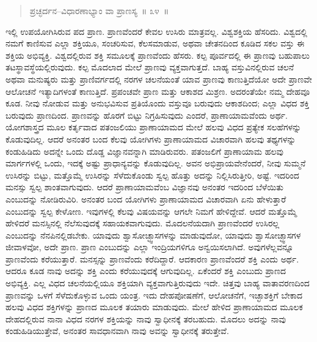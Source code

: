\eject


\begin{verse}
ಪ್ರಚ್ಛರ್ದನ–ವಿಧಾರಣಾಭ್ಯಾಂ ವಾ ಪ್ರಾಣಸ್ಯ~॥ ೩೪~॥
\end{verse}

\vspace{-0.4cm}


ಇಲ್ಲಿ ಉಪಯೋಗಿಸಿರುವ ಪದ ಪ್ರಾಣ. ಪ್ರಾಣವೆಂದರೆ ಕೇವಲ ಉಸಿರು ಮಾತ್ರವಲ್ಲ. ವಿಶ್ವಶಕ್ತಿಯ ಹೆಸರಿದು. ವಿಶ್ವದಲ್ಲಿ ನಮಗೆ ಕಾಣಿಸುವ ಎಲ್ಲಾ ಶಕ್ತಿಯೂ, ಸಂಚರಿಸುವ, ಕೆಲಸಮಾಡುವ, ಅಥವಾ ಚೇತನದಿಂದ ಕೂಡಿದ ಸಕಲ ವಸ್ತು ಈ ಶಕ್ತಿಯ ಅಭಿವ್ಯಕ್ತಿ. ವಿಶ್ವದಲ್ಲಿರುವ ಶಕ್ತಿ ಸಮೂಲಕ್ಕೆ ಪ್ರಾಣವೆಂದು ಹೆಸರು. ಕಲ್ಪ ಪೂರ್ವದಲ್ಲಿ ಈ ಪ್ರಾಣವು ಬಹುಪಾಲು ತಟಸ್ಥಾವಸ್ಥೆಯಲ್ಲಿರುವುದು. ಕಲ್ಪ ಮೊದಲಾದ ಮೇಲೆ ಪ್ರಾಣವು ವ್ಯಕ್ತವಾಗುತ್ತದೆ. ಬಾಹ್ಯ ವಸ್ತುವಿನಲ್ಲಿರುವ ಚಲನೆ ಅಥವಾ ಮನುಷ್ಯರು ಮತ್ತು ಪ್ರಾಣಿವರ್ಗದಲ್ಲಿ ನರಗಳ ಚಲನೆಯಂತೆ ಯಾವ ಪ್ರಾಣವು ಕಾಣುತ್ತಿದೆಯೋ ಅದೇ ಪ್ರಾಣವೇ ಆಲೋಚನೆ ಇತ್ಯಾದಿಗಳಂತೆ ಕಾಣುತ್ತಿದೆ. ಪ್ರಪಂಚವೇ ಪ್ರಾಣ ಮತ್ತು ಆಕಾಶದ ಮಿಶ್ರಣ. ಅದರಂತೆಯೇ ನಮ್ಮ ದೇಹವೂ ಕೂಡ. ನೀವು ನೋಡುವ ಮತ್ತು ಅನುಭವಿಸುವ ಪ್ರತಿಯೊಂದು ವಸ್ತುವೂ ಬರುವುದು ಆಕಾಶದಿಂದ; ಎಲ್ಲಾ ವಿಧದ ಶಕ್ತಿ ಬರುವುದು ಪ್ರಾಣದಿಂದ. ಪ್ರಾಣವನ್ನು ಹೊರಗೆ ಬಿಟ್ಟು ನಿಗ್ರಹಿಸುವುದು ಎಂದರೆ, ಪ್ರಾಣಾಯಾಮವೆಂದು ಅರ್ಥ. ಯೋಗಶಾಸ್ತ್ರದ ಮೂಲ ಕರ್ತೃವಾದ ಪತಂಜಲಿಯು ಪ್ರಾಣಾಯಾಮದ ಮೇಲೆ ಹಲವು ವಿಧದ ಪ್ರತ್ಯೇಕ ಸಲಹೆಗಳನ್ನು ಕೊಡುವುದಿಲ್ಲ. ಆದರೆ ಅನಂತರ ಬಂದ ಕೆಲವು ಯೋಗಿಗಳು ಪ್ರಾಣಾಯಾಮದ ವಿಚಾರವಾಗಿ ಹಲವು ತಥ್ಯಗಳನ್ನು ಕಂಡುಹಿಡಿದು ಅದನ್ನೇ ಒಂದು ದೊಡ್ಡ ವಿಜ್ಞಾನವನ್ನಾಗಿ ಮಾಡಿರುವರು. ಪತಂಜಲಿಗೆ ಪ್ರಾಣಾಯಾಮ ಹಲವು ಮಾರ್ಗಗಳಲ್ಲಿ ಒಂದು, ಇದಕ್ಕೆ ಅಷ್ಟು ಪ್ರಾಧಾನ್ಯವನ್ನು ಕೊಡುವುದಿಲ್ಲ. ಅವನ ಅಭಿಪ್ರಾಯವೇನೆಂದರೆ, ನೀವು ಸುಮ್ಮನೆ ಉಸಿರನ್ನು ಬಿಟ್ಟು, ಮತ್ತೊಮ್ಮೆ ಉಸಿರನ್ನು ಸೆಳೆದುಕೊಂಡು ಸ್ವಲ್ಪ ಹೊತ್ತು ಅದನ್ನು ನಿಲ್ಲಿಸಿರುತ್ತೀರಿ, ಅಷ್ಟೆ. ಇದರಿಂದ ಮನಸ್ಸು ಸ್ವಲ್ಪ ಶಾಂತವಾಗುವುದು. ಆದರೆ ಪ್ರಾಣಾಯಾಮವೆಂಬ ವಿಜ್ಞಾನವು ಅನಂತರ ಇದರಿಂದ ಬೆಳೆಯಿತು ಎಂಬುದನ್ನು ನೋಡಿರುವಿರಿ. ಅನಂತರ ಬಂದ ಯೋಗಿಗಳು ಪ್ರಾಣಾಯಾಮದ ವಿಚಾರವಾಗಿ ಏನು ಹೇಳುತ್ತಾರೆ ಎಂಬುದನ್ನು ಸ್ವಲ್ಪ ಕೇಳೋಣ. ಇವುಗಳಲ್ಲಿ ಕೆಲವು ವಿಷಯವನ್ನು ಆಗಲೇ ನಿಮಗೆ ಹೇಳಿದ್ದೇವೆ. ಆದರೆ ಮತ್ತೊಮ್ಮೆ ಹೇಳಿದರೆ ಮನಸ್ಸಿನಲ್ಲಿ ನೆಲೆಸುವುದಕ್ಕೆ ಸಹಾಯಕವಾಗುವುದು. ಮೊದಲನೆಯದಾಗಿ ಪ್ರಾಣವೆಂದರೆ ಉಸಿರಲ್ಲ ಎಂಬುದನ್ನು ನೆನಪಿನಲ್ಲಿಡಬೇಕು. ಯಾವುದು ಶ್ವಾಸೋಚ್ಛ್ವಾಸಗಳನ್ನು ಮಾಡುವುದೋ, ಯಾವುದು ಶ್ವಾಸೋಚ್ಛ್ವಾಸಗಳ ಜೀವಾಳವೋ, ಅದೇ ಪ್ರಾಣ. ಪ್ರಾಣ ಎಂಬುದನ್ನು ಎಲ್ಲಾ ಇಂದ್ರಿಯಗಳಿಗೂ ಅನ್ವಯಿಸಲಾಗಿದೆ. ಅವುಗಳೆಲ್ಲವನ್ನೂ ಪ್ರಾಣವೆಂದು ಕರೆಯುತ್ತಾರೆ. ಮನಸ್ಸನ್ನು ಪ್ರಾಣವೆಂದು ಕರೆದಿದ್ದಾರೆ. ಆದಕಾರಣ ಪ್ರಾಣವೆಂದರೆ ಶಕ್ತಿ ಎಂದು ಅರ್ಥ. ಆದರೂ ಕೂಡ ನಾವು ಅದನ್ನು ಶಕ್ತಿ ಎಂದು ಕರೆಯುವುದಕ್ಕೆ ಆಗುವುದಿಲ್ಲ. ಏಕೆಂದರೆ ಶಕ್ತಿ ಎಂಬುದು ಪ್ರಾಣದ ಅಭಿವ್ಯಕ್ತಿ. ಎಲ್ಲ ವಿಧದ ಚಲನೆಯಲ್ಲಿಯೂ ಶಕ್ತಿಯಾಗಿ ವ್ಯಕ್ತವಾಗುತ್ತಿರುವುದು ಇದೇ. ಚಿತ್ತವು ಬಾಹ್ಯ ವಾತಾವರಣದಿಂದ ಪ್ರಾಣವನ್ನು ಒಳಗೆ ಸೆಳೆದುಕೊಳ್ಳುವ ಒಂದು ಯಂತ್ರ. ಇದು ದೇಹಪೋಷಣೆಗೆ, ಆಲೋಚನೆಗೆ, ಇಚ್ಛಾಶಕ್ತಿಗೆ ಬೇಕಾದ ಹಲವು ವಿಧದ ಶಕ್ತಿಗಳನ್ನು ಪ್ರಾಣದ ಮೂಲಕ ತಯಾರು ಮಾಡುವುದು. ಮೇಲೆ ಹೇಳಿದ ಪ್ರಾಣಾಯಾಮದ ಮೂಲಕ ದೇಹದಲ್ಲಿರುವ ನಾನಾ ವಿಧದ ನರಗಳ ಶಕ್ತಿಯನ್ನು ನಾವು ಸ್ವಾಧೀನಕ್ಕೆ ತರಬಹುದು. ಮೊದಲು ಅದನ್ನು ನಾವು ಕಂಡುಹಿಡಿಯುತ್ತೇವೆ, ಅನಂತರ ಸಾವಧಾನವಾಗಿ ನಾವು ಅವನ್ನು ಸ್ವಾಧೀನಕ್ಕೆ ತರುತ್ತೇವೆ. 

